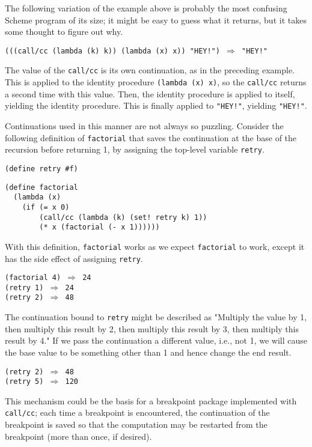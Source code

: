 The following variation of the example above is probably the most confusing
Scheme program of its size; it might be easy to guess what it returns,
but it takes some thought to figure out why.


\texttt{(((call/cc (lambda (k) k)) (lambda (x) x)) "HEY!") \(\Rightarrow\) "HEY!"}

The value of the \texttt{call/cc} is its own continuation, as in the preceding
example.
This is applied to the identity procedure \texttt{(lambda (x) x)}, so the
\texttt{call/cc} returns a second time with this value.
Then, the identity procedure is applied to itself, yielding the identity
procedure.
This is finally applied to \texttt{"HEY!"}, yielding \texttt{"HEY!"}.


Continuations used in this manner are not always so puzzling.
Consider the following definition of \label{further_s64}\texttt{factorial} that saves the
continuation at the base of the recursion before returning 1, by
assigning the top-level variable \label{further_s65}\texttt{retry}\label{further_retry}.


\begin{alltt}
(define retry \#{}f)

(define factorial
  (lambda (x)
    (if (= x 0)
        (call/cc (lambda (k) (set! retry k) 1))
        (* x (factorial (- x 1))))))
\end{alltt}


With this definition, \texttt{factorial} works as we expect
\texttt{factorial} to work, except it has the side effect of assigning
\texttt{retry}.


\begin{alltt}
(factorial 4) \(\Rightarrow\) 24
(retry 1) \(\Rightarrow\) 24
(retry 2) \(\Rightarrow\) 48
\end{alltt}


The continuation bound to \texttt{retry} might be described as "Multiply
the value by 1, then multiply this result by 2, then multiply
this result by 3, then multiply this result by 4."
If we pass the continuation a different value, i.e., not 1, we will
cause the base value to be something other than 1 and hence change
the end result.


\begin{alltt}
(retry 2) \(\Rightarrow\) 48
(retry 5) \(\Rightarrow\) 120
\end{alltt}


This mechanism could be the basis for a breakpoint package implemented with
\texttt{call/cc}; each time a breakpoint is encountered, the continuation of
the breakpoint is saved so that the computation may be restarted from the
breakpoint (more than once, if desired).


